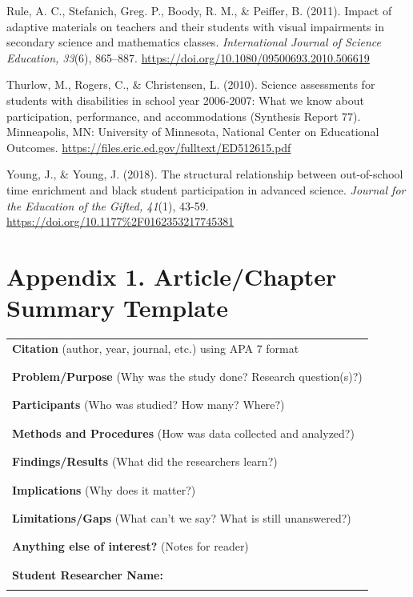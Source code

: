 \documentclass[11.5pt]{sig-alternate}
\begin{document}
Rule, A. C., Stefanich, Greg. P., Boody, R. M., \& Peiffer, B. (2011). Impact of adaptive materials on teachers and their students with visual impairments in secondary science and mathematics classes. \textit{International Journal of Science Education, 33}(6), 865–887.  \url{https://doi.org/10.1080/09500693.2010.506619}    

Thurlow, M., Rogers, C., \& Christensen, L. (2010). Science assessments for students with disabilities in school year 2006-2007: What we know about participation, performance, and accommodations (Synthesis Report 77). Minneapolis, MN: University of Minnesota, National Center on Educational Outcomes. \url{https://files.eric.ed.gov/fulltext/ED512615.pdf} 

Young, J., \& Young, J. (2018). The structural relationship between out-of-school time enrichment and black student participation in advanced science. \textit{Journal for the Education of the Gifted, 41}(1), 43-59. \url{https://doi.org/10.1177\%2F0162353217745381} 

\clearpage
\onecolumn
\leftskip 0in
\parindent 0in

\section*{Appendix 1. Article/Chapter Summary Template}
\begin{table}[!hbp]
\begin{tabular}{|l|}
\hline
{\textbf{Citation} (author, year, journal, etc.) using APA 7 format} \\ \\ \\ \hline
{\textbf{Problem/Purpose} (Why was the study done? Research question(s)?)} \\ \\ \\ \hline
{\textbf{Participants} (Who was studied? How many? Where?)} \\ \\ \\ \hline
{\textbf{Methods and Procedures} (How was data collected and analyzed?)} \\ \\ \\ \hline
{\textbf{Findings/Results} (What did the researchers learn?)} \\ \\ \\ \hline
{\textbf{Implications} (Why does it matter?)} \\ \\ \\ \hline
{\textbf{Limitations/Gaps} (What can’t we say? What is still unanswered?)} \\ \\ \\ \hline
{\textbf{Anything else of interest?} (Notes for reader)} \\ \\ \\ \hline
{\textbf{Student Researcher Name:}} \\ \\ \hline
\end{tabular}
\end{table}
\end{document}
